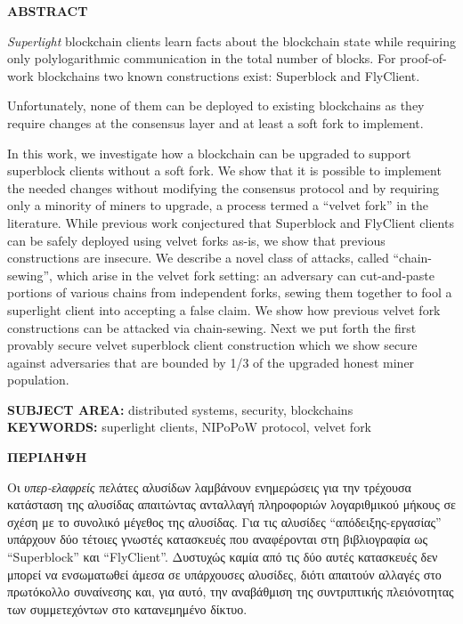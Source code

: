 \begin{center}
\Large{\textbf{ABSTRACT}}
\end{center}
{\em Superlight} blockchain clients
learn facts about the blockchain state
while requiring only polylogarithmic communication in the total
number of blocks.
For proof-of-work blockchains
two known constructions exist: Superblock and FlyClient.

Unfortunately, none of them can be deployed to existing blockchains as they require changes at the consensus layer and at least a soft fork to implement.

In this work, we
investigate how a blockchain can be upgraded to support superblock clients without a soft fork. We show that it is possible to implement the needed changes without modifying the consensus protocol and by requiring only a minority of miners to upgrade, a process termed a ``velvet fork'' in the literature. While previous work conjectured that Superblock and FlyClient clients can be safely deployed using velvet forks as-is, we show that previous constructions are insecure. We describe a novel class of attacks, called  ``chain-sewing'', which arise in the velvet fork setting: an adversary can cut-and-paste portions of various chains from independent forks, sewing them together to
fool a superlight client into accepting a false claim.
We show how previous velvet fork constructions can be attacked via chain-sewing.
Next we put forth the first provably secure velvet superblock client construction which we show  secure against adversaries that are bounded by 1/3 of the upgraded honest miner population.

\vspace{11cm}
\noindent
\textbf{SUBJECT AREA:} distributed systems, security, blockchains\\
\textbf{KEYWORDS:} superlight clients, NIPoPoW protocol, velvet fork

\newpage
\begin{center}
\Large{\textbf{ΠΕΡIΛΗΨΗ}}
\end{center}
Οι \emph{υπερ-ελαφρείς} πελάτες αλυσίδων λαμβάνουν ενημερώσεις για την τρέχουσα κατάσταση της αλυσίδας απαιτώντας ανταλλαγή πληροφοριών λογαριθμικού μήκους σε σχέση με το συνολικό μέγεθος της αλυσίδας. Για τις αλυσίδες ``απόδειξης-εργασίας'' υπάρχουν δύο τέτοιες γνωστές κατασκευές που αναφέρονται στη βιβλιογραφία ως ``Superblock'' και ``FlyClient''. Δυστυχώς καμία από τις δύο αυτές κατασκευές δεν μπορεί να ενσωματωθεί άμεσα σε υπάρχουσες αλυσίδες, διότι απαιτούν αλλαγές στο πρωτόκολλο συναίνεσης και, για αυτό, την αναβάθμιση της συντριπτικής πλειόνοτητας των συμμετεχόντων στο κατανεμημένο δίκτυο. 

